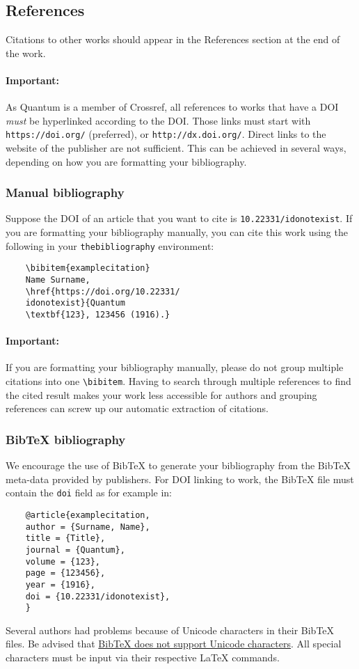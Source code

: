 \documentclass[a4paper,noarxiv,onecolumn]{quantumarticle}
\begin{document}
	\subsection{References}	
	Citations to other works should appear in the References section at the end of the work.
	
	\paragraph{Important:} As Quantum is a member of Crossref, all references to works that have a DOI \emph{must} be hyperlinked according to the DOI. Those links must start with \texttt{https://doi.org/} (preferred), or \texttt{http://dx.doi.org/}. Direct links to the website of the publisher are not sufficient. This can be achieved in several ways, depending on how you are formatting your bibliography.
	
	\subsubsection{Manual bibliography}
	Suppose the DOI of an article that you want to cite is \texttt{10.22331/idonotexist}. If you are formatting your bibliography manually, you can cite this work using the following in your \texttt{thebibliography} environment:
	\begin{verbatim}
	\bibitem{examplecitation}
	Name Surname,
	\href{https://doi.org/10.22331/
	idonotexist}{Quantum
	\textbf{123}, 123456 (1916).}
	\end{verbatim}
	
	\paragraph{Important:} If you are formatting your bibliography manually, please do not group multiple citations into one \texttt{\textbackslash{}bibitem}.
	Having to search through multiple references to find the cited result makes your work less accessible for authors and grouping references can screw up our automatic extraction of citations.
	
	\subsubsection{BibTeX bibliography}
	We encourage the use of BibTeX to generate your bibliography from the BibTeX meta-data provided by publishers.
	For DOI linking to work, the BibTeX file must contain the \texttt{doi} field as for example in:
	\begin{verbatim}
	@article{examplecitation,
	author = {Surname, Name},
	title = {Title},
	journal = {Quantum},
	volume = {123},
	page = {123456},
	year = {1916},
	doi = {10.22331/idonotexist},
	}
	\end{verbatim}
	Several authors had problems because of Unicode characters in their BibTeX files.
	Be advised that \href{http://wiki.lyx.org/BibTeX/Tips}{BibTeX does not support Unicode characters}.
	All special characters must be input via their respective LaTeX commands.
	
\end{document}
